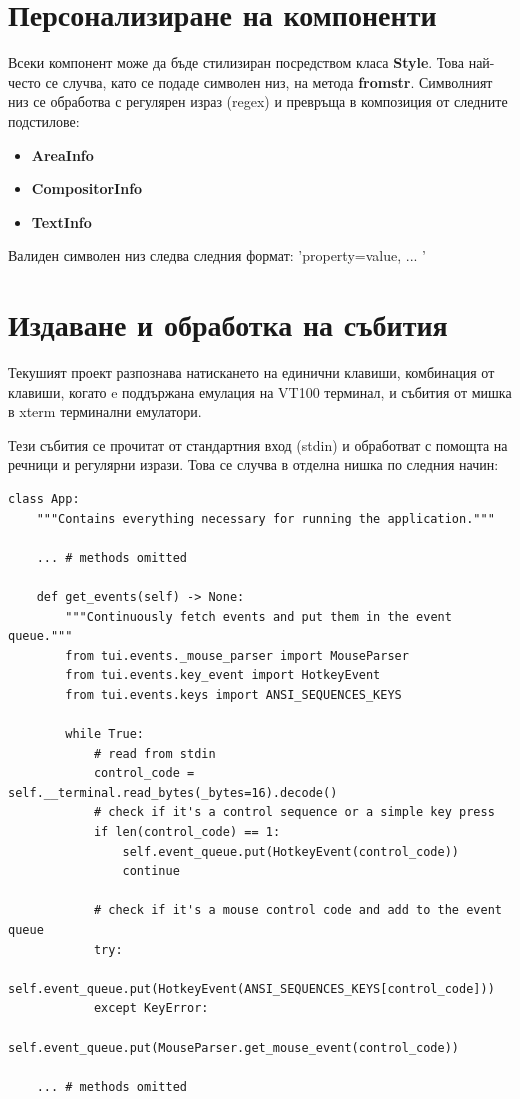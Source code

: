 \section{Персонализиране на компоненти}

        Всеки компонент може да бъде стилизиран посредством класа 
        \textbf{Style}. Това най-често се случва, като се подаде символен низ,
        на метода \textbf{fromstr}. Символният низ се обработва с регулярен
        израз (regex) и превръща в композиция от следните подстилове:

        \begin{itemize}
                \item \textbf{AreaInfo}
                \item \textbf{CompositorInfo}
                \item \textbf{TextInfo}
        \end{itemize}

        Валиден символен низ следва следния формат: 'property=value, ... '

\section{Издаване и обработка на събития}
        
        Текушият проект разпознава натискането на единични клавиши, комбинация
        от клавиши, когато e поддържана емулация на VT100 терминал, и събития
        от мишка в xterm терминални емулатори.

        Тези събития се прочитат от стандартния вход (stdin) и обработват с
        помощта на речници и регулярни изрази. Това се случва в отделна нишка
        по следния начин:

        \vspace{10mm}
        \begin{lstlisting}[style=py]
class App:
    """Contains everything necessary for running the application."""

    ... # methods omitted

    def get_events(self) -> None:
        """Continuously fetch events and put them in the event queue."""
        from tui.events._mouse_parser import MouseParser
        from tui.events.key_event import HotkeyEvent
        from tui.events.keys import ANSI_SEQUENCES_KEYS

        while True:
            # read from stdin
            control_code = self.__terminal.read_bytes(_bytes=16).decode()
            # check if it's a control sequence or a simple key press
            if len(control_code) == 1:
                self.event_queue.put(HotkeyEvent(control_code))
                continue

            # check if it's a mouse control code and add to the event queue
            try:
                self.event_queue.put(HotkeyEvent(ANSI_SEQUENCES_KEYS[control_code]))
            except KeyError:
                self.event_queue.put(MouseParser.get_mouse_event(control_code))

    ... # methods omitted

        \end{lstlisting}
        

